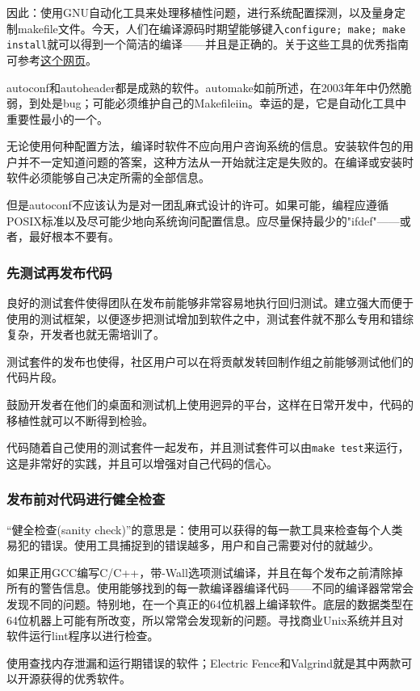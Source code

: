\documentclass[12pt,oneside]{book}
\begin{document}
因此：使用GNU自动化工具来处理移植性问题，进行系统配置探测，以及量身定制makefile文件。今天，人们在编译源码时期望能够键入\verb+configure; make; make install+就可以得到一个简洁的编译——并且是正确的。关于这些工具的优秀指南可参考\href{http://seul.org/docs/autotut/}{这个网页}。

autoconf和autoheader都是成熟的软件。automake如前所述，在2003年年中仍然脆弱，到处是bug；可能必须维护自己的Makefileiin。幸运的是，它是自动化工具中重要性最小的一个。

无论使用何种配置方法，编译时软件不应向用户咨询系统的信息。安装软件包的用户并不一定知道问题的答案，这种方法从一开始就注定是失败的。在编译或安装时软件必须能够自己决定所需的全部信息。

但是autoconf不应该认为是对一团乱麻式设计的许可。如果可能，编程应遵循POSIX标准以及尽可能少地向系统询问配置信息。应尽量保持最少的"ifdef"——或者，最好根本不要有。

\subsubsection{先测试再发布代码}
良好的测试套件使得团队在发布前能够非常容易地执行回归测试。建立强大而便于使用的测试框架，以便逐步把测试增加到软件之中，测试套件就不那么专用和错综复杂，开发者也就无需培训了。

测试套件的发布也使得，社区用户可以在将贡献发转回制作组之前能够测试他们的代码片段。

鼓励开发者在他们的桌面和测试机上使用迥异的平台，这样在日常开发中，代码的移植性就可以不断得到检验。

代码随着自己使用的测试套件一起发布，并且测试套件可以由\verb+make test+来运行，这是非常好的实践，并且可以增强对自己代码的信心。

\subsubsection{发布前对代码进行健全检查}
“健全检查(sanity check)”的意思是：使用可以获得的每一款工具来检查每个人类易犯的错误。使用工具捕捉到的错误越多，用户和自己需要对付的就越少。

如果正用GCC编写C/C++，带-Wall选项测试编译，并且在每个发布之前清除掉所有的警告信息。使用能够找到的每一款编译器编译代码——不同的编译器常常会发现不同的问题。特别地，在一个真正的64位机器上编译软件。底层的数据类型在64位机器上可能有所改变，所以常常会发现新的问题。寻找商业Unix系统并且对软件运行lint程序以进行检查。

使用查找内存泄漏和运行期错误的软件；Electric Fence和Valgrind就是其中两款可以开源获得的优秀软件。
\end{document}
